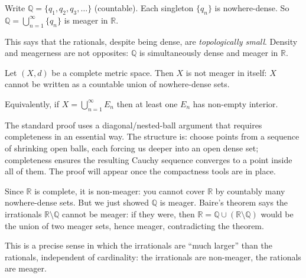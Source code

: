 \begin{example}
\label{ex:Q-meager}
Write $\mathbb{Q} = \{q_1, q_2, q_3, \ldots\}$ (countable).
Each singleton $\{q_n\}$ is nowhere-dense.
So $\mathbb{Q} = \bigcup_{n=1}^\infty \{q_n\}$ is meager in $\mathbb{R}$.

This says that the rationals, despite being dense, are
\emph{topologically small}.
Density and meagerness are not opposites: $\mathbb{Q}$ is simultaneously
dense and meager in $\mathbb{R}$.
\end{example}


\begin{tcolorbox}[colback=thmbox, colframe=thmborder, arc=2pt,
  left=6pt, right=6pt, top=4pt, bottom=4pt,
  title={\small\textbf{Theorem (Baire Category Theorem --- Abbott \S8.2,
         Pugh Theorem 32)}},
  fonttitle=\small\bfseries]
\begin{theorem}
\label{thm:baire-preview}
Let $(X, d)$ be a complete metric space.
Then $X$ is not meager in itself: $X$ cannot be written as a countable
union of nowhere-dense sets.

Equivalently, if $X = \bigcup_{n=1}^\infty E_n$ then at least one $E_n$
has non-empty interior.
\end{theorem}
\end{tcolorbox}

\begin{remark*}
The standard proof uses a diagonal/nested-ball argument that requires
completeness in an essential way.
The structure is: choose points from a sequence of shrinking open balls,
each forcing us deeper into an open dense set; completeness ensures the
resulting Cauchy sequence converges to a point inside all of them.
The proof will appear once the compactness tools are in place.
\end{remark*}

\begin{remark*}
Since $\mathbb{R}$ is complete, it is non-meager: you cannot cover $\mathbb{R}$
by countably many nowhere-dense sets.
But we just showed $\mathbb{Q}$ is meager.
Baire's theorem says the irrationals $\mathbb{R} \setminus \mathbb{Q}$
cannot be meager: if they were, then
$\mathbb{R} = \mathbb{Q} \cup (\mathbb{R} \setminus \mathbb{Q})$
would be the union of two meager sets, hence meager, contradicting
the theorem.

This is a precise sense in which the irrationals are
``much larger'' than the rationals, independent of cardinality:
the irrationals are non-meager, the rationals are meager.
\end{remark*}

